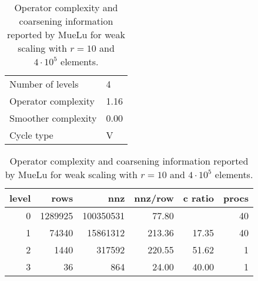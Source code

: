 \begin{table}[h]
    \centering
    \begin{tabular}{|ll|}
    \hline    
    Number of levels    & 4 \\
    Operator complexity & 1.16 \\
    Smoother complexity & 0.00 \\
    Cycle type          & V \\
    \hline
    \end{tabular}
    \begin{tabular}{|rrrrrr|}
        \hline
        level & rows  &   nnz      &  nnz/row & c ratio  & procs \\
        \hline
        0  & 1289925  & 100350531  & 77.80    &          &    40  \\
        1  & 74340    & 15861312   & 213.36   & 17.35    &    40  \\
        2  & 1440     & 317592     & 220.55   & 51.62    &    1   \\
        3  & 36       & 864        & 24.00    & 40.00    &    1   \\
        \hline
    \end{tabular}
    \caption{Operator complexity and coarsening information reported by MueLu for weak scaling with $r=10$ and $4 \cdot 10^5$ elements.}
    \label{table:op_complexity}
\end{table}




